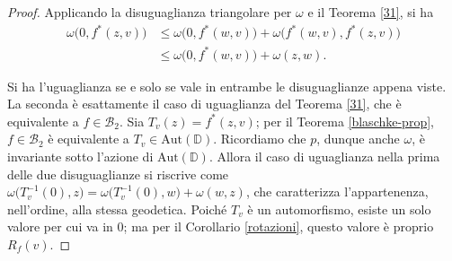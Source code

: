 \begin{proof}
  Applicando la disuguaglianza triangolare per $\omega$ e il Teorema \ref{31}, si ha
  \begin{align*}
    \omega\bigl(0,f^*(z,v)\bigr) & \le \omega\bigl(0,f^*(w,v)\bigr)+\omega\bigl(f^*(w,v),f^*(z,v)\bigr) \\
    & \le \omega\bigl(0,f^*(w,v)\bigr)+\omega(z,w).
  \end{align*}

  Si ha l'uguaglianza se e solo se vale in entrambe le disuguaglianze appena viste. La seconda è esattamente il caso di uguaglianza del Teorema \ref{31}, che è equivalente a $f \in \mathcal{B}_2$. Sia $T_v(z)=f^*(z,v)$; per il Teorema \ref{blaschke-prop}, $f \in \mathcal{B}_2$ è equivalente a $T_v \in \text{Aut}(\mathbb{D})$. Ricordiamo che $p$, dunque anche $\omega$, è invariante sotto l'azione di $\text{Aut}(\mathbb{D})$.
  Allora il caso di uguaglianza nella prima delle due disuguaglianze si riscrive come $\omega\bigl(T_v^{-1}(0),z\bigr)=\omega\bigl(T_v^{-1}(0),w\bigr)+\omega(w,z)$, che caratterizza l'appartenenza, nell'ordine, alla stessa geodetica. Poiché $T_v$ è un automorfismo, esiste un solo valore per cui va in $0$; ma per il Corollario \ref{rotazioni}, questo valore è proprio $R_f(v)$.
\end{proof}

